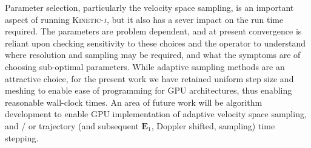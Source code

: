 \documentclass[final,5p,times,twocolumn]{elsarticle}
\renewcommand{\vec}[1]{\mathbf{#1}}
\newcommand{\kj}{\textsc{Kinetic-j}\xspace}
\begin{document}
Parameter selection, particularly the velocity space sampling, is an important aspect of running \kj, but it also has a sever impact on the run time required. The parameters are problem dependent, and at present convergence is reliant upon checking sensitivity to these choices and the operator to understand where resolution and sampling may be required, and what the symptoms are of choosing sub-optimal parameters. While adaptive sampling methods are an attractive choice, for the present work we have retained uniform step size and meshing to enable ease of programming for GPU architectures, thus enabling reasonable wall-clock times. An area of future work will be algorithm development to enable GPU implementation of  adaptive velocity space sampling, and / or trajectory (and subsequent $\vec{E}_{\mathrm{1}}$, Doppler shifted, sampling) time stepping.
\end{document}
